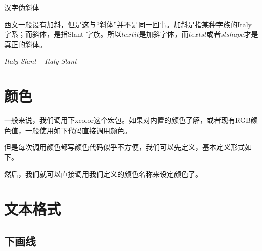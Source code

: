 \begin{latex}{}
{汉字伪斜体}
\end{latex}

西文一般设有加斜，但是这与“斜体”并不是同一回事。加斜是指某种字族的Italy 字系；而斜体，是指Slant 字族。所以$ textit{} $是加斜字体，而$ textsl{} $或者$ slshape $才是真正的斜体。

\begin{center}
	{ \textit{Italy Slant} ~ \textsl{Italy Slant}}
\end{center}

\section{颜色}
一般来说，我们调用下xcolor这个宏包。如果对内置的颜色了解，或者现有RGB颜色值，一般使用如下代码直接调用颜色。

\begin{center}
	\color[RGB]{204, 128, 92}{Color Text中文测试}
\end{center}

\begin{latex}{}
\color[RGB]{204, 128, 92}{Color Text中文测试}
\end{latex}

但是每次调用颜色都写颜色代码似乎不方便，我们可以先定义，基本定义形式如下。
\begin{latex}{}
\usepackage{xcolor}									%
\end{latex}

然后，我们就可以直接调用我们定义的颜色名称来设定颜色了。

\begin{center}
	\color{keyword}{\slshape function, return, if, true, false}
\end{center}

\begin{latex}{}
\color{keyword}{\slshape function, return, if, true, false}
\end{latex}

\section{文本格式}

\subsection{下画线}

